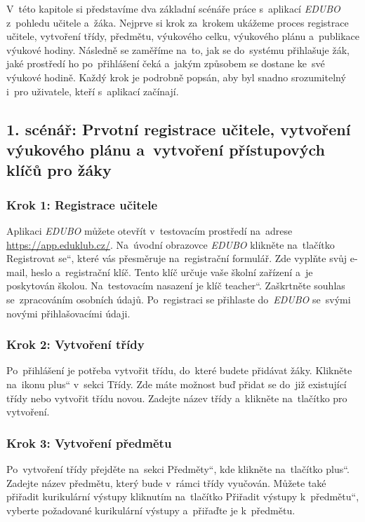 \documentclass[male,czech,api_bc]{kitheses}
\begin{document}
V~této kapitole si představíme dva základní scénáře práce s~aplikací \textit{EDUBO} z~pohledu učitele a~žáka. Nejprve si krok za~krokem ukážeme proces registrace učitele, vytvoření třídy, předmětu, výukového celku, výukového plánu a~publikace výukové hodiny. Následně se zaměříme na~to, jak se do~systému přihlašuje žák, jaké prostředí ho po~přihlášení čeká a~jakým způsobem se dostane ke~své výukové hodině. Každý krok je podrobně popsán, aby byl snadno srozumitelný i~pro uživatele, kteří s~aplikací začínají.

\subsection{1. scénář: Prvotní registrace učitele, vytvoření výukového plánu a~vytvoření přístupových klíčů pro žáky}

\subsubsection{Krok 1: Registrace učitele}
Aplikaci \textit{EDUBO} můžete otevřít v~testovacím prostředí na~adrese \url{https://app.eduklub.cz/}. Na~úvodní obrazovce \textit{EDUBO} klikněte na~tlačítko \quotedblbase Registrovat se``, které vás přesměruje na~registrační formulář. Zde vyplňte svůj e-mail, heslo a~registrační klíč. Tento klíč určuje vaše školní zařízení a~je poskytován školou. Na~testovacím nasazení je klíč \quotedblbase teacher``. Zaškrtněte souhlas se~zpracováním osobních údajů. Po~registraci se přihlaste do~\textit{EDUBO} se~svými novými přihlašovacími údaji.

\subsubsection{Krok 2: Vytvoření třídy}
Po~přihlášení je potřeba vytvořit třídu, do~které budete přidávat žáky. Klikněte na~ikonu \quotedblbase plus`` v~sekci Třídy. Zde máte možnost buď přidat se do~již existující třídy nebo vytvořit třídu novou. Zadejte název třídy a~klikněte na~tlačítko pro vytvoření.

\subsubsection{Krok 3: Vytvoření předmětu}
Po~vytvoření třídy přejděte na~sekci \quotedblbase Předměty``, kde klikněte na~tlačítko \quotedblbase plus``. Zadejte název předmětu, který bude v~rámci třídy vyučován. Můžete také přiřadit kurikulární výstupy kliknutím na~tlačítko \quotedblbase Přiřadit výstupy k~předmětu``, vyberte požadované kurikulární výstupy a~přiřaďte je k~předmětu.
\end{document}
